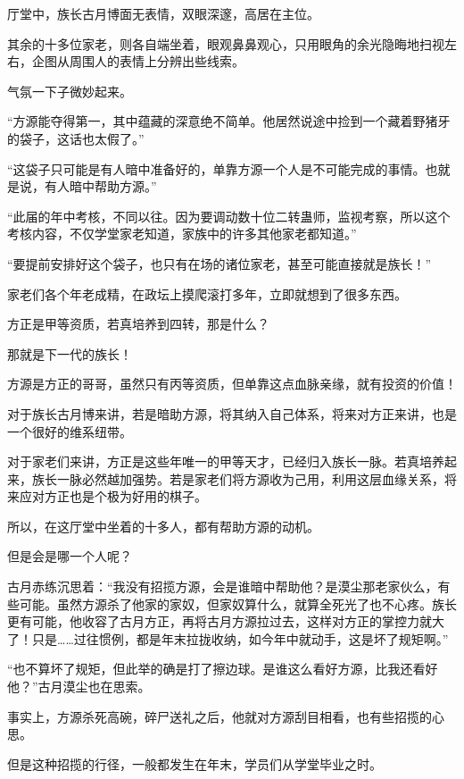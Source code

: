 
\begin{this_body}

厅堂中，族长古月博面无表情，双眼深邃，高居在主位。

其余的十多位家老，则各自端坐着，眼观鼻鼻观心，只用眼角的余光隐晦地扫视左右，企图从周围人的表情上分辨出些线索。

气氛一下子微妙起来。

“方源能夺得第一，其中蕴藏的深意绝不简单。他居然说途中捡到一个藏着野猪牙的袋子，这话也太假了。”

“这袋子只可能是有人暗中准备好的，单靠方源一个人是不可能完成的事情。也就是说，有人暗中帮助方源。”

“此届的年中考核，不同以往。因为要调动数十位二转蛊师，监视考察，所以这个考核内容，不仅学堂家老知道，家族中的许多其他家老都知道。”

“要提前安排好这个袋子，也只有在场的诸位家老，甚至可能直接就是族长！”

家老们各个年老成精，在政坛上摸爬滚打多年，立即就想到了很多东西。

方正是甲等资质，若真培养到四转，那是什么？

那就是下一代的族长！

方源是方正的哥哥，虽然只有丙等资质，但单靠这点血脉亲缘，就有投资的价值！

对于族长古月博来讲，若是暗助方源，将其纳入自己体系，将来对方正来讲，也是一个很好的维系纽带。

对于家老们来讲，方正是这些年唯一的甲等天才，已经归入族长一脉。若真培养起来，族长一脉必然越加强势。若是家老们将方源收为己用，利用这层血缘关系，将来应对方正也是个极为好用的棋子。

所以，在这厅堂中坐着的十多人，都有帮助方源的动机。

但是会是哪一个人呢？

古月赤练沉思着：“我没有招揽方源，会是谁暗中帮助他？是漠尘那老家伙么，有些可能。虽然方源杀了他家的家奴，但家奴算什么，就算全死光了也不心疼。族长更有可能，他收容了古月方正，再将古月方源拉过去，这样对方正的掌控力就大了！只是……过往惯例，都是年末拉拢收纳，如今年中就动手，这是坏了规矩啊。”

“也不算坏了规矩，但此举的确是打了擦边球。是谁这么看好方源，比我还看好他？”古月漠尘也在思索。

事实上，方源杀死高碗，碎尸送礼之后，他就对方源刮目相看，也有些招揽的心思。

但是这种招揽的行径，一般都发生在年末，学员们从学堂毕业之时。


\end{this_body}
